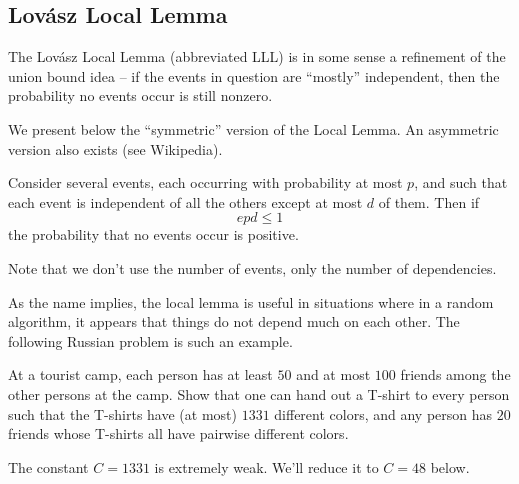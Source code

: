 \documentclass[11pt]{scrartcl}
\begin{document}
\subsection{Lov\'asz Local Lemma}
The Lov\'asz Local Lemma (abbreviated LLL)
is in some sense a refinement of the union bound idea -- if the events in question
are ``mostly'' independent, then the probability no events occur is still nonzero.

We present below the ``symmetric'' version of the Local Lemma.
An asymmetric version also exists (see Wikipedia).
\begin{theorem}
  Consider several events, each occurring with probability at most $p$,
  and such that each event is independent of all the others except at most $d$ of them.
  Then if \[ epd \le 1 \] the probability that no events occur is positive.
\end{theorem}
Note that we don't use the number of events, only the number of dependencies.

As the name implies, the local lemma is useful in situations where in a random algorithm,
it appears that things do not depend much on each other.
The following Russian problem is such an example.

\begin{example}
  [Russia 2006] At a tourist camp,
  each person has at least $50$ and at most $100$ friends among the other persons at the camp.
  Show that one can hand out a T-shirt to every person such that the T-shirts
  have (at most) $1331$ different colors,
  and any person has $20$ friends whose T-shirts all have pairwise different colors.
\end{example}

The constant $C = 1331$ is extremely weak. We'll reduce it to $C = 48$ below.
\end{document}
